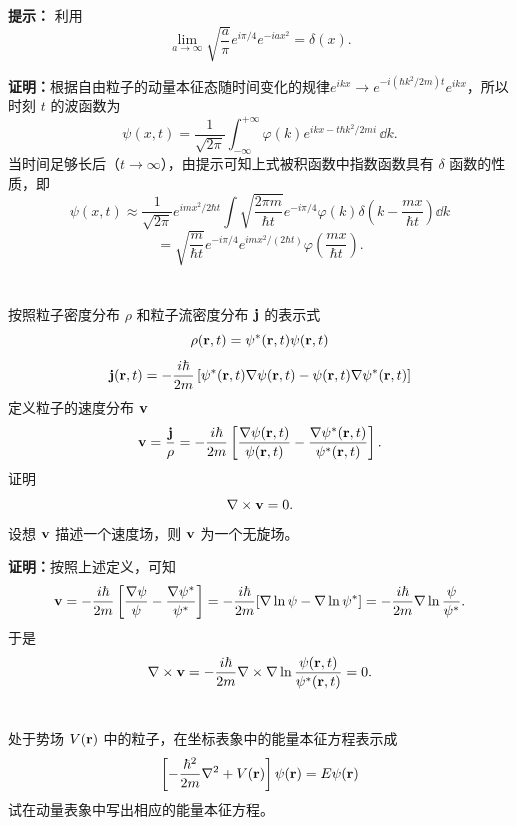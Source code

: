 \documentclass[12pt,a4paper]{article}
\begin{document}
\noindent\textbf{提示：}
利用
\[
\lim_{a\to\infty}\sqrt{\frac{a}{\pi}}e^{i\pi/4}e^{-iax^2}=\delta(x).
\]

\vspace{0.5cm}

\noindent\textbf{证明：}根据自由粒子的动量本征态随时间变化的规律$e^{ikx}\to e^{-i(\hbar k^2/2m)t}e^{ikx}$，所以时刻 $t$ 的波函数为
\[
\psi(x,t)=\frac{1}{\sqrt{2\pi}}\int_{-\infty}^{+\infty}\varphi(k)e^{ikx-t\hbar k^2/2mi}\, \dd k.
\]
当时间足够长后（$t\to\infty$），由提示可知上式被积函数中指数函数具有 $\delta$ 函数的性质，即
\[
\psi(x,t)\approx \frac{1}{\sqrt{2\pi}}e^{imx^2/2\hbar t}
\int \sqrt{\frac{2\pi m}{\hbar t}}e^{-i\pi/4}\varphi(k)
\delta\left(k-\frac{mx}{\hbar t}\right)\dd k
\]
\[
= \sqrt{\frac{m}{\hbar t}}e^{-i\pi/4}e^{imx^2/(2\hbar t)}
\varphi\left(\frac{mx}{\hbar t}\right).
\]

\section{}
按照粒子密度分布 $\rho$ 和粒子流密度分布 $\vb{j}$ 的表示式
\[
\rho(\vb{r},t)=\psi^*(\vb{r},t)\psi(\vb{r},t)
\]
\[
\vb{j}(\vb{r},t)=-\frac{i\hbar}{2m}\left[\psi^*(\vb{r},t)\nabla\psi(\vb{r},t)-\psi(\vb{r},t)\nabla\psi^*(\vb{r},t)\right]
\]
定义粒子的速度分布 $\vb{v}$
\[
\vb{v} = \frac{\vb{j}}{\rho}
= -\frac{i\hbar}{2m}\left[\frac{\nabla\psi(\vb{r},t)}{\psi(\vb{r},t)} - \frac{\nabla\psi^*(\vb{r},t)}{\psi^*(\vb{r},t)}\right].
\]
证明
\[
\nabla\times \vb{v} = 0.
\]
设想 $\vb{v}$ 描述一个速度场，则 $\vb{v}$ 为一个无旋场。

\vspace{0.5cm}

\noindent\textbf{证明：}按照上述定义，可知
\[
\vb{v}
= -\frac{i\hbar}{2m}\left[\frac{\nabla\psi}{\psi} - \frac{\nabla\psi^*}{\psi^*}\right]
= -\frac{i\hbar}{2m}[\nabla\ln\psi - \nabla\ln\psi^*]
= -\frac{i\hbar}{2m}\nabla\ln\frac{\psi}{\psi^*}.
\]
于是
\[
\nabla\times \vb{v}
= -\frac{i\hbar}{2m}\nabla\times\nabla\ln\frac{\psi(\vb{r},t)}{\psi^*(\vb{r},t)} = 0.
\]

\section{}
处于势场 $V(\vb{r})$ 中的粒子，在坐标表象中的能量本征方程表示成
\[
\left[-\frac{\hbar^2}{2m}\nabla^2 + V(\vb{r})\right]\psi(\vb{r})=E\psi(\vb{r})
\]
试在动量表象中写出相应的能量本征方程。

\vspace{0.5cm}
\end{document}
